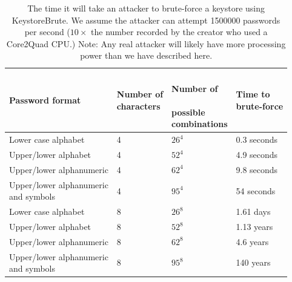 \documentclass[12pt, titlepage]{article}
\begin{document}
\begin{center}
\begin{table}[h!]
    \begin{tabular}{ | l | l | l | l |}
    \hline
    \textbf{Password format} & \shortstack{\textbf{Number of} \\ \textbf{characters}} & \shortstack{\\ \textbf{Number of} \\ \\ \textbf{possible} \\ \textbf{combinations}} & \shortstack{\textbf{Time to} \\ \textbf{brute-force}} \\ \hline
    Lower case alphabet  & 4 & $26^4$ & 0.3 seconds \\ \hline
    Upper/lower alphabet  & 4 & $52^4$ & 4.9 seconds \\ \hline
    Upper/lower alphanumeric & 4 & $62^4$ & 9.8 seconds \\ \hline
    \shortstack{Upper/lower alphanumeric \\ and symbols}  & 4 & $95^4$ & 54 seconds \\ \hline
    Lower case alphabet  & 8 & $26^8$ & 1.61 days \\ \hline
    Upper/lower alphabet  & 8 & $52^8$ & 1.13 years \\ \hline
    Upper/lower alphanumeric & 8 & $62^8$ & 4.6 years \\ \hline
    \shortstack{Upper/lower alphanumeric \\ and symbols}  & 8 & $95^8$ & 140 years \\ \hline
    
    \end{tabular}
    \caption{The time it will take an attacker to brute-force a keystore using KeystoreBrute. We assume the attacker can attempt 1500000 passwords per second ($10 \times$ the number recorded by the creator who used a Core2Quad CPU.)
    \newline Note: Any real attacker will likely have more processing power than we have described here.} \label{tab:keystoreBruteforce}
    \end{table}
\end{center}
\end{document}
